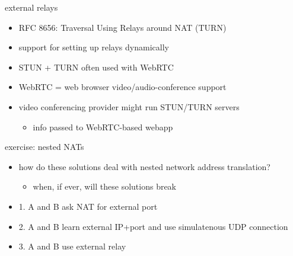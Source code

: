 \begin{frame}{external relays}
    \begin{itemize}
    \item RFC 8656: Traversal Using Relays around NAT (TURN)
    \item support for setting up relays dynamically
    \vspace{.5cm}
    \item STUN + TURN often used with WebRTC
    \item WebRTC = web browser video/audio-conference support
    \item video conferencing provider might run STUN/TURN servers
        \begin{itemize}
        \item info passed to WebRTC-based webapp
        \end{itemize}
    \end{itemize}
\end{frame}

\begin{frame}{exercise: nested NATs}
    \begin{itemize}
    \item how do these solutions deal with nested network address translation?
        \begin{itemize}
        \item when, if ever, will these solutions break
        \end{itemize}
    \vspace{.5cm}
    \item 1. A and B ask NAT for external port
    \item 2. A and B learn external IP+port and use simulatenous UDP connection
    \item 3. A and B use external relay
    \end{itemize}
\end{frame}

